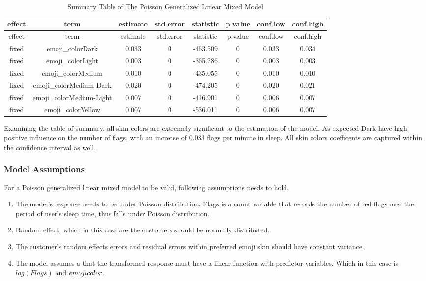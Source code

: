 \documentclass[
          english,
          paper=a4,
              ,captions=tableheading
  ]{scrartcl}
\begin{document}
\begin{longtable}[]{@{}cccccccc@{}}
\caption{Summary Table of The Poisson Generalized Linear Mixed
Model}\tabularnewline
\toprule
effect & term & estimate & std.error & statistic & p.value & conf.low &
conf.high \\
\midrule
\endfirsthead
\toprule
effect & term & estimate & std.error & statistic & p.value & conf.low &
conf.high \\
\midrule
\endhead
fixed & emoji\_colorDark & 0.033 & 0 & -463.509 & 0 & 0.033 & 0.034 \\
fixed & emoji\_colorLight & 0.003 & 0 & -365.286 & 0 & 0.003 & 0.003 \\
fixed & emoji\_colorMedium & 0.010 & 0 & -435.055 & 0 & 0.010 & 0.010 \\
fixed & emoji\_colorMedium-Dark & 0.020 & 0 & -474.205 & 0 & 0.020 &
0.021 \\
fixed & emoji\_colorMedium-Light & 0.007 & 0 & -416.901 & 0 & 0.006 &
0.007 \\
fixed & emoji\_colorYellow & 0.007 & 0 & -536.011 & 0 & 0.006 & 0.007 \\
\bottomrule
\end{longtable}

Examining the table of summary, all skin colors are extremely
significant to the estimation of the model. As expected Dark have high
positive influence on the number of flags, with an increase of 0.033
flags per minute in sleep. All skin colors coefficents are captured
within the confidence interval as well.

\hypertarget{model-assumptions-1}{%
\subsubsection{Model Assumptions}\label{model-assumptions-1}}

For a Poisson generalized linear mixed model to be valid, following
assumptions needs to hold.

\begin{enumerate}
\def\labelenumi{\arabic{enumi}.}
\item
  The model's response needs to be under Poisson distribution. Flags is
  a count variable that records the number of red flags over the period
  of user's sleep time, thus falls under Poisson distribution.
\item
  Random effect, which in this case are the customers should be normally
  distributed.
\item
  The customer's random effects errors and residual errors within
  preferred emoji skin should have constant variance.
\item
  The model assumes a that the transformed response must have a linear
  function with predictor variables. Which in this case is
  \(log(Flags)\) and \(emoji \\color\).
\end{enumerate}
\end{document}
